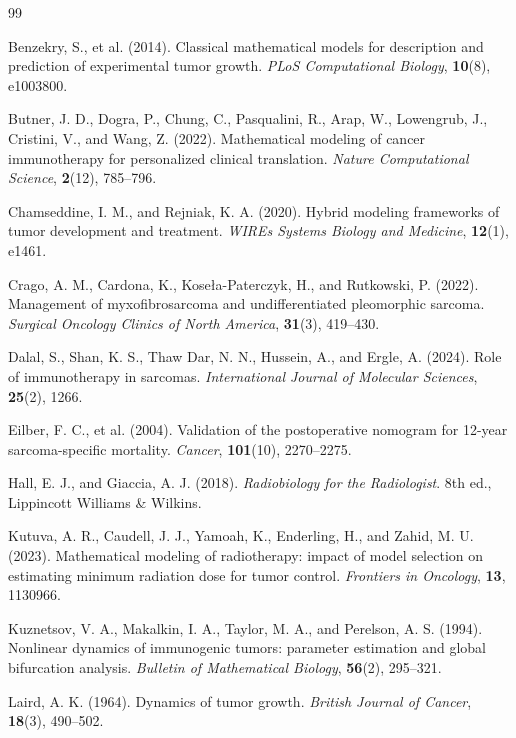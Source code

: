\documentclass[11pt, reqno]{amsart}
\numberwithin{equation}{section}
\theoremstyle{definition}
\begin{document}
\begin{thebibliography}{99}


Benzekry, S., et al. (2014).
Classical mathematical models for description and prediction of experimental tumor growth.
\textit{PLoS Computational Biology}, \textbf{10}(8), e1003800.

Butner, J. D., Dogra, P., Chung, C., Pasqualini, R., Arap, W., Lowengrub, J., Cristini, V., and Wang, Z. (2022).
Mathematical modeling of cancer immunotherapy for personalized clinical translation.
\textit{Nature Computational Science}, \textbf{2}(12), 785--796.

Chamseddine, I. M., and Rejniak, K. A. (2020).
Hybrid modeling frameworks of tumor development and treatment.
\textit{WIREs Systems Biology and Medicine}, \textbf{12}(1), e1461.

Crago, A. M., Cardona, K., Kose{\l}a-Paterczyk, H., and Rutkowski, P. (2022).
Management of myxofibrosarcoma and undifferentiated pleomorphic sarcoma.
\textit{Surgical Oncology Clinics of North America}, \textbf{31}(3), 419--430.

Dalal, S., Shan, K. S., Thaw Dar, N. N., Hussein, A., and Ergle, A. (2024).
Role of immunotherapy in sarcomas.
\textit{International Journal of Molecular Sciences}, \textbf{25}(2), 1266.

Eilber, F. C., et al. (2004).
Validation of the postoperative nomogram for 12-year sarcoma-specific mortality.
\textit{Cancer}, \textbf{101}(10), 2270--2275.

Hall, E. J., and Giaccia, A. J. (2018).
\textit{Radiobiology for the Radiologist}.
8th ed., Lippincott Williams \& Wilkins.

Kutuva, A. R., Caudell, J. J., Yamoah, K., Enderling, H., and Zahid, M. U. (2023).
Mathematical modeling of radiotherapy: impact of model selection on estimating minimum radiation dose for tumor control.
\textit{Frontiers in Oncology}, \textbf{13}, 1130966.

Kuznetsov, V. A., Makalkin, I. A., Taylor, M. A., and Perelson, A. S. (1994).
Nonlinear dynamics of immunogenic tumors: parameter estimation and global bifurcation analysis.
\textit{Bulletin of Mathematical Biology}, \textbf{56}(2), 295--321.

Laird, A. K. (1964).
Dynamics of tumor growth.
\textit{British Journal of Cancer}, \textbf{18}(3), 490--502.


\end{thebibliography}
\end{document}
